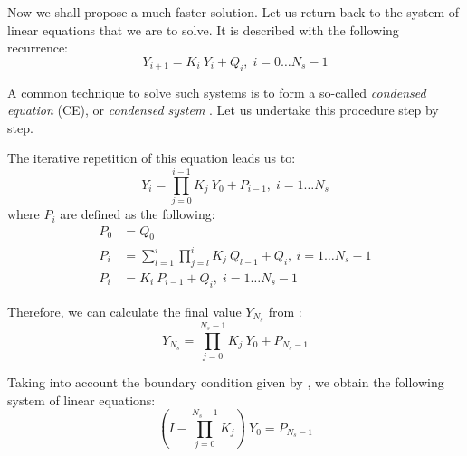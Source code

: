 Now we shall propose a much faster solution. Let us return back to the system of linear equations that we are to solve. It is described with the following recurrence:
\begin{equation} \label{eq:ce-recurrent}
  Y_{i + 1} = K_i \: Y_i + Q_i, \; i = 0 \dots N_s - 1
\end{equation}

A common technique to solve such systems is to form a so-called \emph{condensed equation} (CE), or \emph{condensed system} \cite{stoer2002}. Let us undertake this procedure step by step.

The iterative repetition of this equation leads us to:
\begin{equation} \label{eq:y-recurrent}
  Y_i = \prod_{j = 0}^{i - 1} K_j \: Y_0 + P_{i - 1}, \; i = 1 \dots N_s
\end{equation}
where $P_i$ are defined as the following:
\begin{align}
  P_0 & = Q_0 \nonumber \\
  P_i & = \sum_{l = 1}^i \prod_{j = l}^i K_j \: Q_{l - 1} + Q_i, \: i = 1 \dots N_s - 1 \nonumber \\
  P_i & = K_i \: P_{i - 1} + Q_i, \; i = 1 \dots N_s - 1 \label{eq:p-recurrent}
\end{align}

Therefore, we can calculate the final value $Y_{N_s}$ from :
\[
  Y_{N_s} = \prod_{j = 0}^{N_s - 1} K_j \: Y_0 + P_{N_s - 1}
\]

Taking into account the boundary condition given by , we obtain the following system of linear equations:
\begin{equation} \label{eq:core-system}
  (I - \prod_{j = 0}^{N_s - 1} K_j) \: Y_0 = P_{N_s - 1}
\end{equation}

